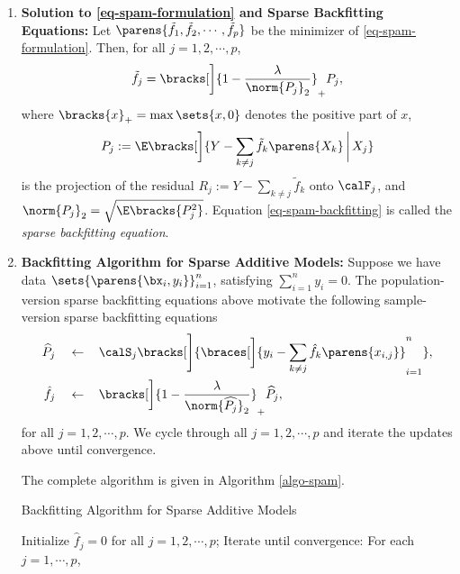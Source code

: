 \documentclass[12pt]{article}
\begin{document}
\begin{enumerate}[label=\textbf{\arabic*.}]
	\item \textbf{Solution to \eqref{eq-spam-formulation} and Sparse Backfitting Equations:} Let $\parens{\tilde{f}_1, \tilde{f}_2, \cdots, \tilde{f}_p}$ be the minimizer of \eqref{eq-spam-formulation}. Then, for all $j = 1, 2, \cdots, p$, 
	\begin{align}\label{eq-spam-backfitting}
		\tilde{f}_j = \bracks[\bigg]{1 - \frac{\lambda}{\norm{P_j}_2}}_+ P_j, 
	\end{align}
	where $\bracks{x}_+ = \max \sets{x, 0}$ denotes the positive part of $x$, 
	\begin{align*}
		P_j := \E \bracks[\bigg]{Y - \sum_{k \neq j} \tilde{f}_k \parens{X_k} \,\bigg\vert\, X_j}
	\end{align*}
	is the projection of the residual $R_j := Y - \sum_{k \neq j} \tilde{f}_k$ onto $\calF_j$, and $\norm{P_j}_2 = \sqrt{\E \bracks{P_j^2}}$. Equation \eqref{eq-spam-backfitting} is called the \emph{sparse backfitting equation}. 
	
	\item \textbf{Backfitting Algorithm for Sparse Additive Models:} Suppose we have data $\sets{\parens{\bx_i, y_i}}_{i=1}^n$, satisfying $\sum_{i=1}^n y_i = 0$. The population-version sparse backfitting equations above motivate the following sample-version sparse backfitting equations 
	\begin{align}
		\widehat{P}_j \quad \leftarrow \quad & \, \calS_j \bracks[\Bigg]{\braces[\bigg]{y_i - \sum_{k \neq j} \hat{f}_k \parens{x_{i,j}}}_{i=1}^n}, \\ 
		\hat{f}_j \quad \leftarrow \quad & \, \bracks[\bigg]{1 - \frac{\lambda}{\norm{\widehat{P_j}}_2}}_+ \widehat{P}_j, 
	\end{align}
	for all $j = 1, 2, \cdots, p$. We cycle through all $j = 1, 2, \cdots, p$ and iterate the updates above until convergence. 
	
	The complete algorithm is given in Algorithm \ref{algo-spam}. 
	
	\begin{minipage}{\linewidth}
		\begin{algorithm}[H]
			\caption{Backfitting Algorithm for Sparse Additive Models}\label{algo-spam}
			\begin{algorithmic}[1]
			
			\STATE Initialize $\hat{f}_j = 0$ for all $j = 1, 2, \cdots, p$; 
			\STATE Iterate until convergence: For each $j = 1, \cdots, p$, 
			\begin{enumerate}
			

\end{enumerate}
\end{algorithmic}
\end{algorithm}
\end{minipage}
\end{enumerate}
\end{document}
